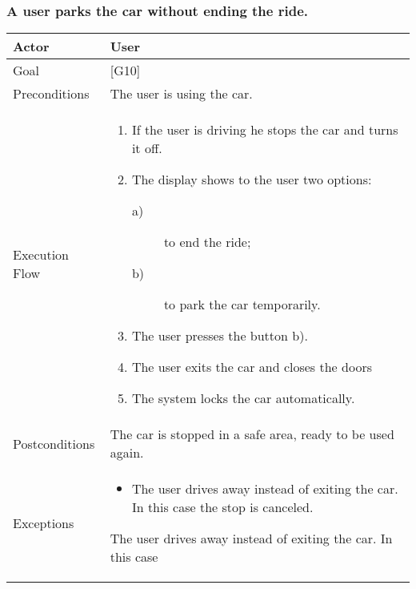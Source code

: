 \documentclass[english]{article}
\begin{document}
		\subsubsection{A user parks the car without ending the ride.}
		\begin{tabularx}{\textwidth}{  l  X  }
			\hline
			Actor & User\\
			\hline
			Goal & [G10]\\
			\hline
			Preconditions & The user is using the car.\\
			\hline
			Execution Flow & \begin{enumerate}
				\item{If the user is driving he stops the car and turns it off.}
				\item{The display shows to the user two options:
					\begin{description}
						\item[a)]{ to end the ride;}
						\item[b)]{ to park the car temporarily.}
					\end{description}}
					\item{The user presses the button b).}
					\item{The user exits the car and closes the doors}
					\item{The system locks the car automatically.}
				\end{enumerate}\\
				\hline
				Postconditions & The car is stopped in a safe area, ready to be used again.\\
				\hline
				Exceptions & \begin{itemize}
					\item{The user drives away instead of exiting the car. In this case the stop is canceled.}
				\end{itemize}The user drives away instead of exiting the car. In this case\\
				\hline
			\end{tabularx}
			
			
\end{document}

